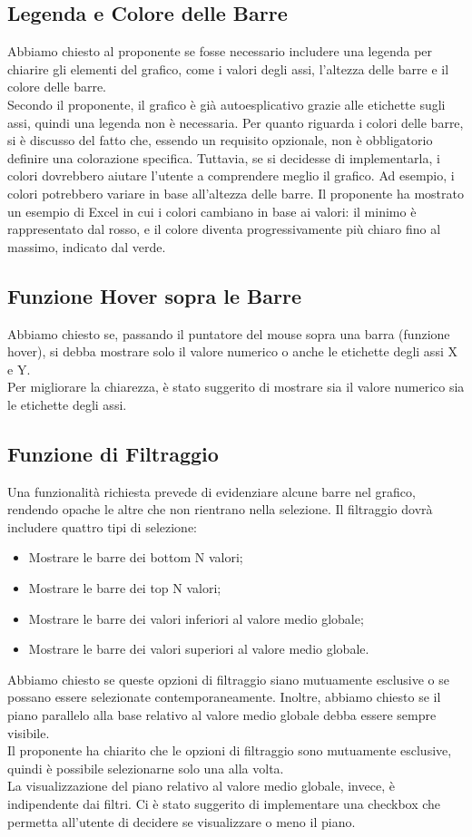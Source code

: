 \subsection{Legenda e Colore delle Barre}
Abbiamo chiesto al proponente se fosse necessario includere una legenda per chiarire gli elementi del grafico, come i valori degli assi, l'altezza delle barre e il colore delle barre.\\
Secondo il proponente, il grafico è già autoesplicativo grazie alle etichette sugli assi, quindi una legenda non è necessaria.
Per quanto riguarda i colori delle barre, si è discusso del fatto che, essendo un requisito opzionale, non è obbligatorio definire una colorazione specifica. 
Tuttavia, se si decidesse di implementarla, i colori dovrebbero aiutare l'utente a comprendere meglio il grafico. 
Ad esempio, i colori potrebbero variare in base all'altezza delle barre.
Il proponente ha mostrato un esempio di Excel in cui i colori cambiano in base ai valori: il minimo è rappresentato dal rosso, e il colore diventa progressivamente più chiaro fino al massimo, indicato dal verde.

\subsection{Funzione Hover sopra le Barre}
Abbiamo chiesto se, passando il puntatore del mouse sopra una barra (funzione hover), si debba mostrare solo il valore numerico o anche le etichette degli assi X e Y.\\
Per migliorare la chiarezza, è stato suggerito di mostrare sia il valore numerico sia le etichette degli assi.

\subsection{Funzione di Filtraggio}
Una funzionalità richiesta prevede di evidenziare alcune barre nel grafico, rendendo opache le altre che non rientrano nella selezione. 
Il filtraggio dovrà includere quattro tipi di selezione:
\begin{itemize} 
    \item Mostrare le barre dei bottom N valori;
    \item Mostrare le barre dei top N valori;
    \item Mostrare le barre dei valori inferiori al valore medio globale;
    \item Mostrare le barre dei valori superiori al valore medio globale. 
\end{itemize}
Abbiamo chiesto se queste opzioni di filtraggio siano mutuamente esclusive o se possano essere selezionate contemporaneamente. 
Inoltre, abbiamo chiesto se il piano parallelo alla base relativo al valore medio globale debba essere sempre visibile.\\
Il proponente ha chiarito che le opzioni di filtraggio sono mutuamente esclusive, quindi è possibile selezionarne solo una alla volta.\\ 
La visualizzazione del piano relativo al valore medio globale, invece, è indipendente dai filtri. 
Ci è stato suggerito di implementare una checkbox che permetta all'utente di decidere se visualizzare o meno il piano.

